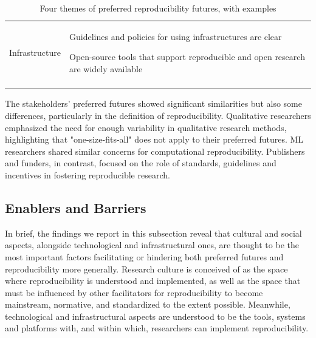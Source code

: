 \documentclass[authordate, meta]{jote-new-article}
\begin{document}
\begin{table}
\begin{tabularx}{\linewidth}{@{} l X @{}}
    \midrule
    Infrastructure & \begin{tabitemize}
        \item Guidelines and policies for using infrastructures are clear
        \item Open-source tools that support reproducible and open research are widely available
    \end{tabitemize} \\ \addlinespace
    \bottomrule
\end{tabularx}
\caption{Four themes of preferred reproducibility futures, with examples}
\end{table}









	The stakeholders' preferred futures showed significant similarities but also some differences, particularly in the definition of reproducibility. Qualitative researchers emphasized the need for enough variability in qualitative research methods, highlighting that "one-size-fits-all" does not apply to their preferred futures. ML researchers shared similar concerns for computational reproducibility. Publishers and funders, in contrast, focused on the role of standards, guidelines and incentives in fostering reproducible research.







	\subsection{Enablers and Barriers}



	In brief, the findings we report in this subsection reveal that cultural and social aspects, alongside technological and infrastructural ones, are thought to be the most important factors facilitating or hindering both preferred futures and reproducibility more generally. Research culture is conceived of as the space where reproducibility is understood and implemented, as well as the space that must be influenced by other facilitators for reproducibility to become mainstream, normative, and standardized to the extent possible. Meanwhile, technological and infrastructural aspects are understood to be the tools, systems and platforms with, and within which, researchers can implement reproducibility.
\end{document}
